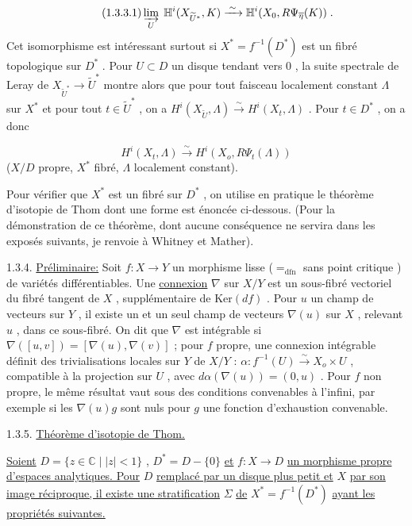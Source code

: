 \begin{equation}\tag{1.3.3.1}
\varinjlim_U \; \mathbb{H}^i(X_{\widetilde{U}^*} , K) \xrightarrow{\;\sim\;} \mathbb{H}^i(X_0, R\Psi_{\overline{\eta}} (K)) \; .
\end{equation}
Cet isomorphisme est intéressant surtout si $X^* = f^{-1}(D^*)$ est un fibré topologique sur $D^*$ . Pour $U \subset D$ un disque tendant vers $0$ , la suite spectrale
de Leray de $X_{\widetilde{U}^*} \to \widetilde{U}^*$ montre alors que pour tout faisceau localement constant $\Lambda$ sur $X^*$ et pour tout $t \in \widetilde{U}^*$ , on a $H^i(X_{\widetilde{U}}, \Lambda) \xrightarrow{\sim} H^i(X_t, \Lambda)$ . Pour $t \in D^*$ , on a donc

\begin{equation}\tag{1.3.3.2}
H^i(X_t, \Lambda) \xrightarrow{\sim} H^i(X_o, R\Psi_t(\Lambda))
\end{equation}
($X/D$ propre, $X^*$ fibré, $\Lambda$ localement constant).

Pour vérifier que $X^*$ est un fibré sur $D^*$ , on utilise en pratique le théorème d'isotopie de Thom dont une forme est énoncée ci-dessous. (Pour la démonstration de ce théorème, dont aucune conséquence ne servira dans les exposés suivants, je renvoie à Whitney et Mather).

1.3.4. \underline{Préliminaire:} Soit $f : X \to Y$ un morphisme lisse ($=_{\mathrm{dfn}}$ sans point critique ) de variétés différentiables. Une \underline{connexion} $\nabla$ sur $X/Y$ est un sous-fibré vectoriel du fibré tangent de $X$ , supplémentaire de $\mathrm{Ker}(df)$ . Pour $u$ un champ de vecteurs sur $Y$ , il existe un et un seul champ de vecteurs $\nabla(u)$ sur $X$ , relevant $u$ , dans ce sous-fibré. On dit que $\nabla$ est intégrable si $\nabla([u, v]) = [\nabla(u), \nabla(v)]$ ; pour $f$ propre, une connexion intégrable définit des trivialisations locales sur $Y$ de $X/Y$ : $\alpha : f^{-1}(U) \xrightarrow{\sim} X_o \times U$ , compatible à la projection sur $U$ , avec $d\alpha (\nabla(u)) = (0, u)$ . Pour $f$ non propre, le même résultat vaut sous des conditions convenables à l'infini, par exemple si les $\nabla(u)g$ sont nuls pour $g$ une fonction d'exhaustion convenable.


1.3.5. \underline{Théorème d'isotopie de Thom.}

\underline{Soient} $D = \{z \in \mathbb{C} \mid |z| < 1\}$ , $D^* = D-\{0\}$ \underline{et} $f : X \to D$ \underline{un morphisme propre d'espaces analytiques. Pour} $D$ \underline{remplacé par un disque plus petit et} $X$ \underline{par son image réciproque, il existe une stratification} $\Sigma$ \underline{de} $X^* = f^{-1}(D^*)$ \underline{ayant les propriétés suivantes.}

